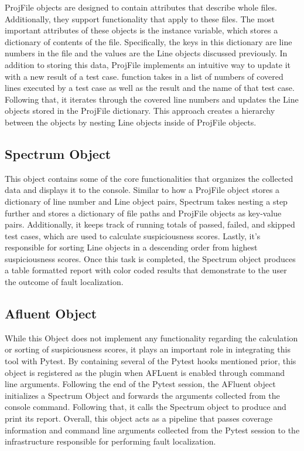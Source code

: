 ProjFile objects are designed to contain attributes that describe whole files.
Additionally, they support functionality that apply to these files. The most
important attributes of these objects is the  instance variable,
which stores a dictionary of contents of the file. Specifically, the keys in
this dictionary are line numbers in the file and the values are the Line objects
discussed previously. In addition to storing this data, ProjFile implements an
intuitive way to update it with a new result of a test case. 
function takes in a list of numbers of covered lines executed by a test case as well as the
result and the name of that test case. Following that, it iterates through the
covered line numbers and updates the Line objects stored in the ProjFile
dictionary. This approach creates a hierarchy between the objects by nesting
Line objects inside of ProjFile objects.

\subsection{Spectrum Object}
\label{subsec:spectrum_obj}

This object contains some of the core functionalities that organizes the
collected data and displays it to the console. Similar to how a ProjFile object
stores a dictionary of line number and Line object pairs, Spectrum takes nesting
a step further and stores a dictionary of file paths and ProjFile objects as
key-value pairs. Additionally, it keeps track of running totals of passed,
failed, and skipped test cases, which are used to calculate suspiciousness
scores. Lastly, it's responsible for sorting Line objects in a descending order
from highest suspiciousness scores. Once this task is completed, the Spectrum
object produces a table formatted report with color coded results that
demonstrate to the user the outcome of fault localization.

\subsection{Afluent Object}
\label{subsec:afluent_obj}

While this Object does not implement any functionality regarding the calculation
or sorting of suspiciousness scores, it plays an important role in integrating
this tool with Pytest. By containing several of the Pytest hooks mentioned
prior, this object is registered as the plugin when AFLuent is enabled through
command line arguments. Following the end of the Pytest session, the AFluent
object initializes a Spectrum Object and forwards the arguments collected from
the console command. Following that, it calls the Spectrum object to produce and
print its report. Overall, this object acts as a pipeline that passes coverage
information and command line arguments collected from the Pytest session to the
infrastructure responsible for performing fault localization.

